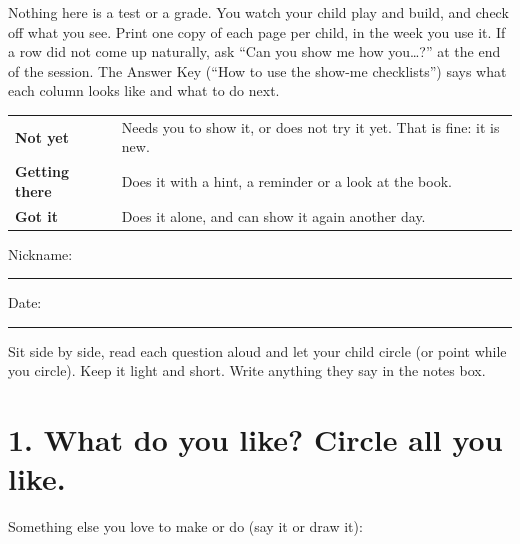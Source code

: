 \documentclass[track=junior,level=1]{kidscode}
\makeatletter
\newcommand{\pick}[2]{\begin{tabular}{@{}c@{}}{\fontsize{34}{40}\selectfont #1}\\[4pt]\textbf{#2}\end{tabular}}
\makeatother
\begin{document}

\begin{grownup}
Nothing here is a test or a grade. You watch your child play and build, and check off what you
see. Print one copy of each page per child, in the week you use it. If a row did not come up
naturally, ask \enquote{Can you show me how you\dots?} at the end of the session. The Answer Key
(\enquote{How to use the show-me checklists}) says what each column looks like and what to do next.
\end{grownup}

\begin{center}\renewcommand{\arraystretch}{1.4}
\begin{tabularx}{\linewidth}{@{}>{\bfseries}p{3.4cm}X@{}}
\toprule
Not yet & Needs you to show it, or does not try it yet. That is fine: it is new.\\
Getting there & Does it with a hint, a reminder or a look at the book.\\
Got it & Does it alone, and can show it again another day.\\
\bottomrule
\end{tabularx}
\end{center}


Nickname: \rule{6cm}{0.4pt}\hfill Date: \rule{3.5cm}{0.4pt}

\begin{grownup}
Sit side by side, read each question aloud and let your child circle (or point while you circle).
Keep it light and short. Write anything they say in the notes box.
\end{grownup}

\section{1. What do you like? Circle all you like.}
\begin{center}
\end{center}
Something else you love to make or do (say it or draw it):
\answerspace{3cm}
\end{document}

